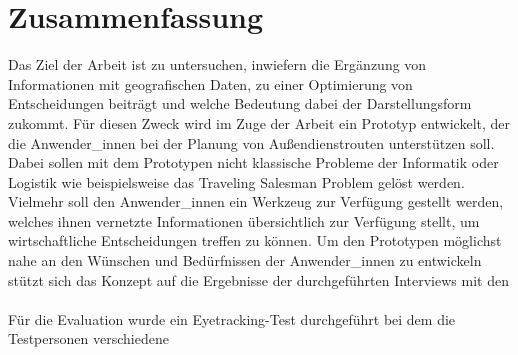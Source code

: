 \documentclass[Bachelorarbeit.tex]{subfiles}
\begin{document}
\chapter*{Zusammenfassung}

Das Ziel der Arbeit ist zu untersuchen, 
inwiefern die Ergänzung  von Informationen mit geografischen Daten, 
zu einer Optimierung von Entscheidungen beiträgt und welche Bedeutung dabei der Darstellungsform zukommt. 
Für diesen Zweck wird im Zuge der Arbeit ein Prototyp entwickelt, der die Anwender\_innen bei der Planung von Außendienstrouten unterstützen soll. 
Dabei sollen mit dem Prototypen nicht klassische Probleme der Informatik oder Logistik wie beispielsweise das Traveling Salesman Problem gelöst werden. Vielmehr soll den Anwender\_innen ein Werkzeug zur Verfügung gestellt werden, welches ihnen vernetzte Informationen übersichtlich zur Verfügung stellt, um wirtschaftliche Entscheidungen treffen zu können.
Um den Prototypen möglichst nahe an den Wünschen und Bedürfnissen der Anwender\_innen zu entwickeln stützt sich das Konzept auf die Ergebnisse der durchgeführten Interviews mit den\\
\\
Für die Evaluation wurde ein Eyetracking-Test durchgeführt bei dem die Testpersonen verschiedene 
\end{document}
